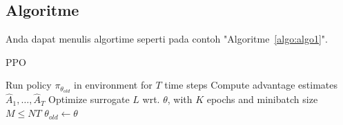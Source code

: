        
    \subsection{Algoritme}
    \label{subsec:algo}
    
    Anda dapat menulis algortime seperti pada contoh "Algoritme~\ref{algo:algo1}". 
    \begin{algorithm}
    	\caption{PPO} 
    	\label{algo:algo1}
    	\begin{algorithmic}[1]
    				\State Run policy $\pi_{\theta_{old}}$ in environment for $T$ time steps
    				\State Compute advantage estimates $\hat{A}_{1},\ldots,\hat{A}_{T}$
    			\EndFor
    			\State Optimize surrogate $L$ wrt. $\theta$, with $K$ epochs and minibatch size $M\leq NT$
    			\State $\theta_{old}\leftarrow\theta$
    		\EndFor
    	\end{algorithmic} 
    \end{algorithm}
    
